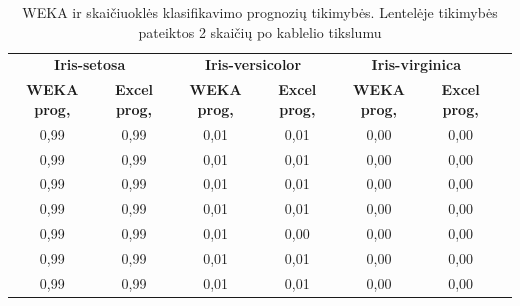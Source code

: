 \documentclass{VUMIFPSbakalaurinis}
\begin{document}
\begin{table}[]
  \centering
  \caption{WEKA ir skaičiuoklės klasifikavimo prognozių tikimybės.
    Lentelėje tikimybės pateiktos 2 skaičių po kablelio tikslumu}{
        \begin{tabular}{|cc|cc|cc|l}
        \cline{1-6}
        \multicolumn{2}{|c|}{\textbf{Iris-setosa}}                       & \multicolumn{2}{c|}{\textbf{Iris-versicolor}}                   & \multicolumn{2}{c|}{\textbf{Iris-virginica}}                    &  \\ \cline{1-6}
        \multicolumn{1}{|c|}{\textbf{WEKA prog,}} & \textbf{Excel prog,} & \multicolumn{1}{c|}{\textbf{WEKA prog,}} & \textbf{Excel prog,} & \multicolumn{1}{c|}{\textbf{WEKA prog,}} & \textbf{Excel prog,} &  \\ \cline{1-6}
        \multicolumn{1}{|c|}{0,99}                & 0,99                 & \multicolumn{1}{c|}{0,01}                & 0,01                 & \multicolumn{1}{c|}{0,00}                & 0,00                 &  \\ \cline{1-6}
        \multicolumn{1}{|c|}{0,99}                & 0,99                 & \multicolumn{1}{c|}{0,01}                & 0,01                 & \multicolumn{1}{c|}{0,00}                & 0,00                 &  \\ \cline{1-6}
        \multicolumn{1}{|c|}{0,99}                & 0,99                 & \multicolumn{1}{c|}{0,01}                & 0,01                 & \multicolumn{1}{c|}{0,00}                & 0,00                 &  \\ \cline{1-6}
        \multicolumn{1}{|c|}{0,99}                & 0,99                 & \multicolumn{1}{c|}{0,01}                & 0,01                 & \multicolumn{1}{c|}{0,00}                & 0,00                 &  \\ \cline{1-6}
        \multicolumn{1}{|c|}{0,99}                & 0,99                 & \multicolumn{1}{c|}{0,01}                & 0,00                 & \multicolumn{1}{c|}{0,00}                & 0,00                 &  \\ \cline{1-6}
        \multicolumn{1}{|c|}{0,99}                & 0,99                 & \multicolumn{1}{c|}{0,01}                & 0,01                 & \multicolumn{1}{c|}{0,00}                & 0,00                 &  \\ \cline{1-6}
        \multicolumn{1}{|c|}{0,99}                & 0,99                 & \multicolumn{1}{c|}{0,01}                & 0,01                 & \multicolumn{1}{c|}{0,00}                & 0,00                 &  \\ \cline{1-6}

\end{tabular}}
\end{table}
\end{document}
